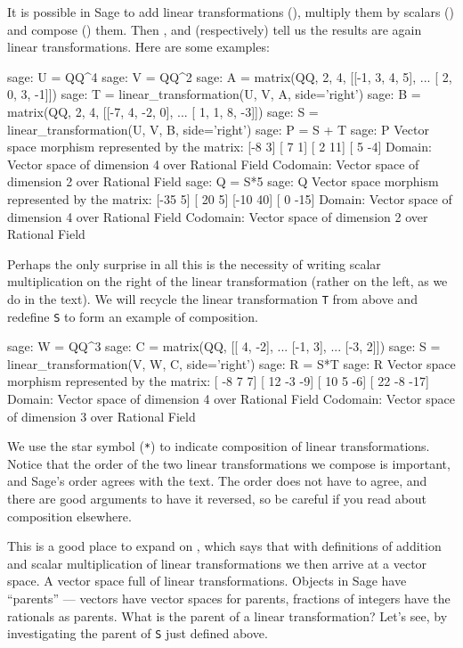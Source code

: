 It is possible in Sage to add linear transformations (), multiply them by scalars () and compose () them.  Then  , and  (respectively) tell us the results are again linear transformations.  Here are some examples:
%
\begin{sageexample}
sage: U = QQ^4
sage: V = QQ^2
sage: A = matrix(QQ, 2, 4, [[-1, 3, 4,  5],
...                         [ 2, 0, 3, -1]])
sage: T = linear_transformation(U, V, A, side='right')
sage: B = matrix(QQ, 2, 4, [[-7, 4, -2,  0],
...                         [ 1, 1,  8, -3]])
sage: S = linear_transformation(U, V, B, side='right')
sage: P = S + T
sage: P
Vector space morphism represented by the matrix:
[-8  3]
[ 7  1]
[ 2 11]
[ 5 -4]
Domain: Vector space of dimension 4 over Rational Field
Codomain: Vector space of dimension 2 over Rational Field
sage: Q = S*5
sage: Q
Vector space morphism represented by the matrix:
[-35   5]
[ 20   5]
[-10  40]
[  0 -15]
Domain: Vector space of dimension 4 over Rational Field
Codomain: Vector space of dimension 2 over Rational Field
\end{sageexample}
%
Perhaps the only surprise in all this is the necessity of writing scalar multiplication on the right of the linear transformation (rather on the left, as we do in the text).  We will recycle the linear transformation \verb?T? from above and redefine \verb?S? to form an example of composition.
%
\begin{sageexample}
sage: W = QQ^3
sage: C = matrix(QQ, [[ 4, -2],
...                   [-1,  3],
...                   [-3,  2]])
sage: S = linear_transformation(V, W, C, side='right')
sage: R = S*T
sage: R
Vector space morphism represented by the matrix:
[ -8   7   7]
[ 12  -3  -9]
[ 10   5  -6]
[ 22  -8 -17]
Domain: Vector space of dimension 4 over Rational Field
Codomain: Vector space of dimension 3 over Rational Field
\end{sageexample}
%
We use the star symbol (\verb?*?) to indicate composition of linear transformations.  Notice that the order of the two linear transformations we compose is important, and Sage's order agrees with the text.  The order does not have to agree, and there are good arguments to have it reversed, so be careful if you read about composition elsewhere.\par
%
This is a good place to expand on , which says that with definitions of addition and scalar multiplication of linear transformations we then arrive at a vector space.  A vector space full of linear transformations.  Objects in Sage have ``parents'' --- vectors have vector spaces for parents, fractions of integers have the rationals as parents.  What is the parent of a linear transformation?  Let's see, by investigating the parent of \verb?S? just defined above.
